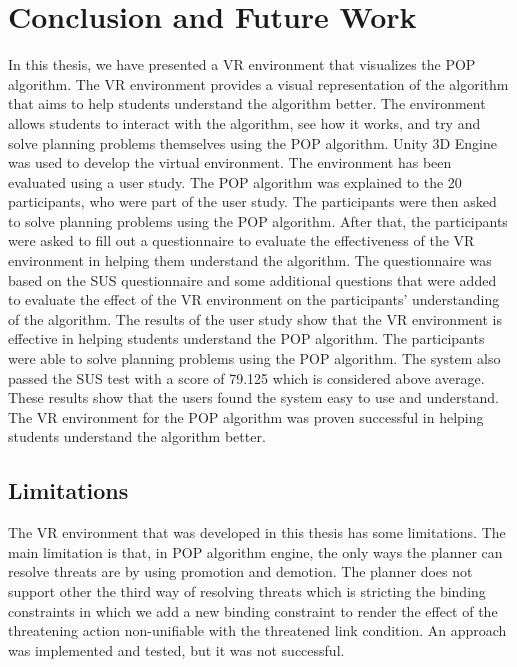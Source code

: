 \chapter{Conclusion and Future Work}\label{chap:concl}


In this thesis, we have presented a \ac{VR} environment that visualizes the \ac{POP} algorithm. The \ac{VR} environment provides a visual representation of the algorithm that aims to help students understand the algorithm better. The environment allows students to interact with the algorithm, see how it works, and try and solve planning problems themselves using the \ac{POP} algorithm. Unity 3D Engine was used to develop the virtual environment. The environment has been evaluated using a user study. The \ac{POP} algorithm was explained to the 20 participants, who were part of the user study. The participants were then asked to solve planning problems using the \ac{POP} algorithm. After that, the participants were asked to fill out a questionnaire to evaluate the effectiveness of the \ac{VR} environment in helping them understand the algorithm. The questionnaire was based on the \ac{SUS} questionnaire and some additional questions that were added to evaluate the effect of the \ac{VR} environment on the participants' understanding of the algorithm. The results of the user study show that the \ac{VR} environment is effective in helping students understand the \ac{POP} algorithm. The participants were able to solve planning problems using the \ac{POP} algorithm. The system also passed the \ac{SUS} test with a score of 79.125 which is considered above average. These results show that the users found the system easy to use and understand. The \ac{VR} environment for the \ac{POP} algorithm was proven successful in helping students understand the algorithm better.

\section{Limitations}

The \ac{VR} environment that was developed in this thesis has some limitations. The main limitation is that, in \ac{POP} algorithm engine, the only ways the planner can resolve threats are by using promotion and demotion. The planner does not support other the third way of resolving threats which is stricting the binding constraints in which we add a new binding constraint to render the effect of the threatening action non-unifiable with the threatened link condition. An approach was implemented and tested, but it was not successful.


